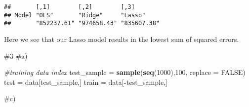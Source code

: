 \documentclass[
]{article}
\newenvironment{Shaded}{\begin{snugshade}}{\end{snugshade}}
\newcommand{\CommentTok}[1]{\textcolor[rgb]{0.56,0.35,0.01}{\textit{#1}}}
\newcommand{\DataTypeTok}[1]{\textcolor[rgb]{0.13,0.29,0.53}{#1}}
\newcommand{\DecValTok}[1]{\textcolor[rgb]{0.00,0.00,0.81}{#1}}
\newcommand{\KeywordTok}[1]{\textcolor[rgb]{0.13,0.29,0.53}{\textbf{#1}}}
\newcommand{\NormalTok}[1]{#1}
\newcommand{\OperatorTok}[1]{\textcolor[rgb]{0.81,0.36,0.00}{\textbf{#1}}}
\newcommand{\OtherTok}[1]{\textcolor[rgb]{0.56,0.35,0.01}{#1}}
\newcommand{\StringTok}[1]{\textcolor[rgb]{0.31,0.60,0.02}{#1}}
\begin{document}
\begin{verbatim}
##       [,1]        [,2]        [,3]       
## Model "OLS"       "Ridge"     "Lasso"    
##       "852237.61" "974658.43" "835607.38"
\end{verbatim}

Here we see that our Lasso model results in the lowest sum of squared
errors.

\#3 \#a)

\begin{Shaded}
\end{Shaded}

\begin{Shaded}
\begin{Highlighting}[]
\CommentTok{#training data index}
\NormalTok{test_sample =}\StringTok{ }\KeywordTok{sample}\NormalTok{(}\KeywordTok{seq}\NormalTok{(}\DecValTok{1000}\NormalTok{),}\DecValTok{100}\NormalTok{, }\DataTypeTok{replace =} \OtherTok{FALSE}\NormalTok{)}
\NormalTok{test =}\StringTok{ }\NormalTok{data[test_sample,]}
\NormalTok{train =}\StringTok{ }\NormalTok{data[}\OperatorTok{-}\NormalTok{test_sample,]}
\end{Highlighting}
\end{Shaded}

\#c)
\end{document}
